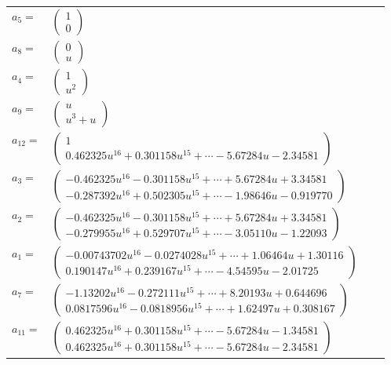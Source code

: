 \documentclass[1p]{elsarticle_modified}
\theoremstyle{definition}
\begin{document}
\begin{tabular}{m{7pt} m{180pt} m{7pt} m{180pt} }
\flushright $a_{5}=$&$\begin{pmatrix}1\\0\end{pmatrix}$ \\
\flushright $a_{8}=$&$\begin{pmatrix}0\\u\end{pmatrix}$ \\
\flushright $a_{4}=$&$\begin{pmatrix}1\\u^2\end{pmatrix}$ \\
\flushright $a_{9}=$&$\begin{pmatrix}u\\u^3+u\end{pmatrix}$ \\
\flushright $a_{12}=$&$\begin{pmatrix}1\\0.462325 u^{16}+0.301158 u^{15}+\cdots-5.67284 u-2.34581\end{pmatrix}$ \\
\flushright $a_{3}=$&$\begin{pmatrix}-0.462325 u^{16}-0.301158 u^{15}+\cdots+5.67284 u+3.34581\\-0.287392 u^{16}+0.502305 u^{15}+\cdots-1.98646 u-0.919770\end{pmatrix}$ \\
\flushright $a_{2}=$&$\begin{pmatrix}-0.462325 u^{16}-0.301158 u^{15}+\cdots+5.67284 u+3.34581\\-0.279955 u^{16}+0.529707 u^{15}+\cdots-3.05110 u-1.22093\end{pmatrix}$ \\
\flushright $a_{1}=$&$\begin{pmatrix}-0.00743702 u^{16}-0.0274028 u^{15}+\cdots+1.06464 u+1.30116\\0.190147 u^{16}+0.239167 u^{15}+\cdots-4.54595 u-2.01725\end{pmatrix}$ \\
\flushright $a_{7}=$&$\begin{pmatrix}-1.13202 u^{16}-0.272111 u^{15}+\cdots+8.20193 u+0.644696\\0.0817596 u^{16}-0.0818956 u^{15}+\cdots+1.62497 u+0.308167\end{pmatrix}$ \\
\flushright $a_{11}=$&$\begin{pmatrix}0.462325 u^{16}+0.301158 u^{15}+\cdots-5.67284 u-1.34581\\0.462325 u^{16}+0.301158 u^{15}+\cdots-5.67284 u-2.34581\end{pmatrix}$ \\

\end{tabular}
\end{document}
